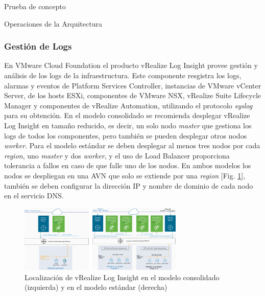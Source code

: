 \begin{section}{Prueba de concepto}
\begin{subsection}{Operaciones de la Arquitectura\cite{CFopermanagement}}
\subsubsection{Gestión de Logs}
En VMware Cloud Foundation el producto vRealize Log Insight provee gestión y análisis de los logs de la infraestructura. Este componente resgistra los logs, alarmas y eventos de Platform Services Controller, instancias de VMware vCenter Server, de los hosts ESXi, componentes de VMware NSX, vRealize Suite Lifecycle Manager y componentes de vRealize Automation, utilizando el protocolo \textit{syslog} para su obtención. En el modelo consolidado se recomienda desplegar vRealize Log Insight en tamaño reducido, es decir, un solo nodo \textit{master} que gestiona los logs de todos los componentes, pero también se pueden desplegar otros nodos \textit{worker}. Para el modelo estándar se deben desplegar al menos tres nodos por cada \textit{region}, uno \textit{master} y dos \textit{worker}, y el uso de Load Balancer proporciona tolerancia a fallos en caso de que falle uno de los nodos. En ambos modelos los nodos se despliegan en una AVN que solo se extiende por una \textit{region} [Fig. \ref{fig:redLogIsight}], también se deben configurar la dirección IP y nombre de dominio de cada nodo en el servicio DNS.
    \begin{figure}[h!]
  \centering
  \includegraphics[width=0.7\textwidth]{imaxes/conceptosPrevios/networkLogInsight.png}
  \caption{Localización de vRealize Log Insight en el modelo consolidado (izquierda) y en el modelo estándar (derecha)}
  \label{fig:redLogIsight}
\end{figure}
\FloatBarrier
\end{subsection}
\end{section}